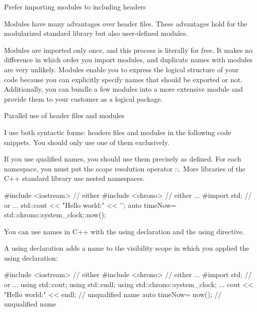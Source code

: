 \begin{myWarning}{Prefer importing modules to including headers}

Modules have many advantages over header files. These advantages hold for the modularized standard library but also user-defined modules.

Modules are imported only once, and this process is literally for free. It makes no difference in which order you import modules, and duplicate names with modules are very unlikely. Modules enable you to express the logical structure of your code because you can explicitly specify names that should be exported or not. Additionally, you can bundle a few modules into a more extensive module and provide them to your customer as a logical package.

\end{myWarning}

\begin{myWarning}{Parallel use of header files and modules}

I use both syntactic forms: headers files and modules in the following code snippets. You should only use one of them exclusively.

\end{myWarning}


If you use qualified names, you should use them precisely as defined. For each namespace, you must put the scope resolution operator ::. More libraries of the C++ standard library use nested namespaces.

\begin{cpp}
#include <iostream> // either
#include <chrono> // either
...
#import std; // or
...
std::cout << "Hello world:" << '\n';
auto timeNow= std::chrono::system_clock::now();
\end{cpp}


You can use names in C++ with the using declaration and the using directive.


A using declaration adds a name to the visibility scope in which you applied the using declaration:

\begin{cpp}
#include <iostream> // either
#include <chrono> // either
...
#import std; // or
...
using std::cout;
using std::endl;
using std::chrono::system_clock;
...
cout << "Hello world:" << endl; // unqualified name
auto timeNow= now(); // unqualified name
\end{cpp}

